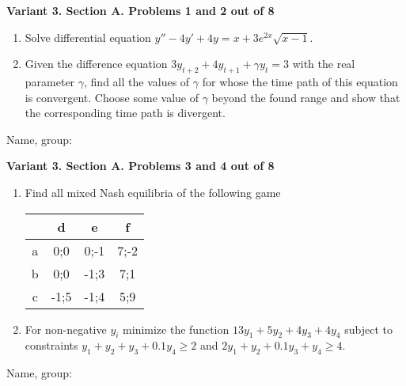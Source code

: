 \documentclass[12pt,a4paper]{article}
\begin{document}
\newpage
\textbf{Variant 3. Section A. Problems 1 and 2 out of 8}

\begin{enumerate}

\item Solve differential equation $y''-4y'+4y=x+3e^{2x} \sqrt{x-1}$.

\item Given the difference equation $3y_{t+2} +4y_{t+1} +\gamma y_{t} =3$ with the real parameter $\gamma $, find all the values of  $\gamma$ for whose the time path of this equation is convergent.
Choose some value of $\gamma$ beyond the found range and show that the corresponding time path is divergent.



\end{enumerate}


\begin{framed}
\begin{minipage}{42em}
Name, group:\vspace*{3ex}\par
\noindent\dotfill
\end{minipage}
\end{framed}

\newpage
\textbf{Variant 3. Section A. Problems 3 and 4 out of 8}

\begin{enumerate}[resume]

\item Find all mixed Nash equilibria of the following game

\begin{tabular}{c|ccc}
  & d & e & f \\
\midrule
a & 0;0  & 0;-1 & 7;-2 \\
b & 0;0  & -1;3 & 7;1 \\
c & -1;5 & -1;4 & 5;9
\end{tabular}

\item For non-negative $y_i$ minimize the function $13y_1 + 5 y_2 + 4y_3 +4y_4$ subject to constraints $y_1 + y_2 + y_3 +0.1y_4 \geq 2$ and $2y_1+y_2+0.1y_3+y_4 \geq 4$.

\end{enumerate}


\begin{framed}
\begin{minipage}{42em}
Name, group:\vspace*{3ex}\par
\noindent\dotfill
\end{minipage}
\end{framed}
\end{document}
